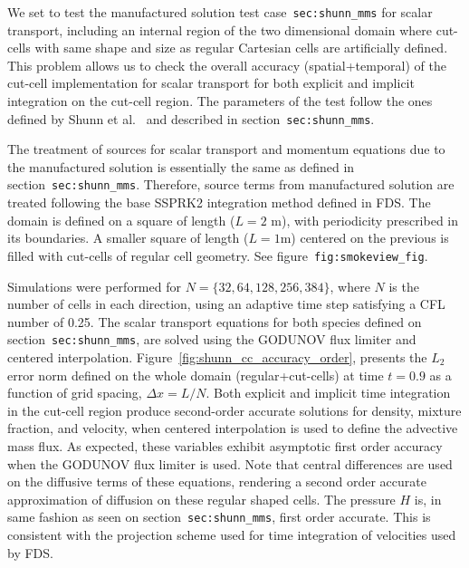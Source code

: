 \documentclass[12pt]{article}
\begin{document}
We set to test the manufactured solution test case~\texttt{sec:shunn\_mms} for scalar transport, including an internal region of the two dimensional domain where cut-cells with same shape and size as regular Cartesian cells are artificially defined. This problem allows us to check the overall accuracy (spatial+temporal) of the cut-cell implementation for scalar transport for both explicit and implicit integration on the cut-cell region.
The parameters of the test follow the ones defined by Shunn et al.~\cite{Shunn:2012} and described in section~\texttt{sec:shunn\_mms}.

The treatment of sources for scalar transport and momentum equations due to the manufactured solution is essentially the same as defined in section~\texttt{sec:shunn\_mms}. Therefore, source terms from manufactured solution are treated following the base SSPRK2 integration method defined in FDS.
The domain is defined on a square of length ($L=2$ m), with periodicity prescribed in its boundaries. A smaller square of length ($L=1$m) centered on the previous is filled with cut-cells of regular cell geometry. See figure~\texttt{fig:smokeview\_fig}.




Simulations were performed for $N = \{32, 64, 128, 256, 384\}$, where $N$ is the number of cells in each direction, using an adaptive time step satisfying a CFL number of 0.25. The scalar transport equations for both species defined on section~\texttt{sec:shunn\_mms}, are solved using the GODUNOV flux limiter and centered interpolation. Figure~\ref{fig:shunn_cc_accuracy_order}, presents the $L_2$ error norm defined on the whole domain (regular+cut-cells) at time $t = 0.9$ as a function of grid spacing, $\Delta x = L/N$. Both explicit and implicit time integration in the cut-cell region produce second-order accurate solutions for density, mixture fraction, and velocity, when centered interpolation is used to define the advective mass flux. As expected, these variables exhibit asymptotic first order accuracy when the GODUNOV flux limiter is used. Note that central differences are used on the diffusive terms of these equations, rendering a second order accurate approximation of diffusion on these regular shaped cells. The pressure $H$ is, in same fashion as seen on section~\texttt{sec:shunn\_mms}, first order accurate. This is consistent with the projection scheme used for time integration of velocities used by FDS.
\end{document}
